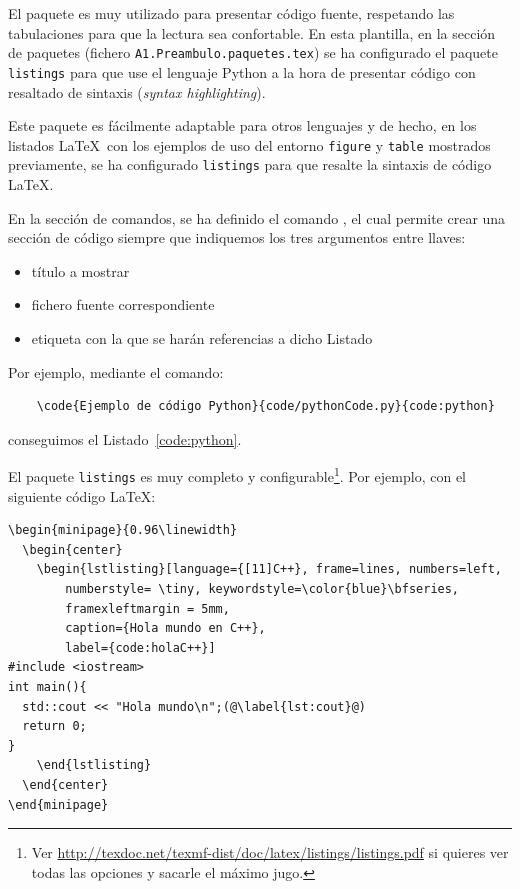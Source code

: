 El paquete  es muy utilizado para presentar código fuente, respetando las tabulaciones para que la lectura sea confortable. En esta plantilla, en la sección de paquetes (fichero \texttt{A1.Preambulo.paquetes.tex}) se ha configurado el paquete \texttt{listings} para que use el lenguaje Python a la hora de presentar código con resaltado de sintaxis (\emph{syntax highlighting}). 

Este paquete es fácilmente adaptable para otros lenguajes y de hecho, en los listados \LaTeX\ con los ejemplos de uso del entorno \texttt{figure} y \texttt{table} mostrados previamente, se ha configurado \texttt{listings} para que resalte la sintaxis de código \LaTeX.

En la sección de comandos, se ha definido el comando , el cual permite crear una sección de código siempre que indiquemos los tres argumentos entre llaves:
\begin{itemize}
    \item título a mostrar
    \item fichero fuente correspondiente
    \item etiqueta con la que se harán referencias a dicho Listado
\end{itemize}

Por ejemplo, mediante el comando: 

\begin{verbatim}
	\code{Ejemplo de código Python}{code/pythonCode.py}{code:python}
\end{verbatim}

\noindent conseguimos el Listado~\ref{code:python}.



El paquete \texttt{listings} es muy completo y configurable\footnote{Ver \url{http://texdoc.net/texmf-dist/doc/latex/listings/listings.pdf} si quieres ver todas las opciones y sacarle el máximo jugo.}. Por ejemplo, con el siguiente código \LaTeX:

\begin{verbatim}
\begin{minipage}{0.96\linewidth}
  \begin{center}
    \begin{lstlisting}[language={[11]C++}, frame=lines, numbers=left,
        numberstyle= \tiny,	keywordstyle=\color{blue}\bfseries,
        framexleftmargin = 5mm,
        caption={Hola mundo en C++},
        label={code:holaC++}]
#include <iostream>
int main(){
  std::cout << "Hola mundo\n";(@\label{lst:cout}@)
  return 0;
}
    \end{lstlisting}
  \end{center}
\end{minipage}
\end{verbatim}


